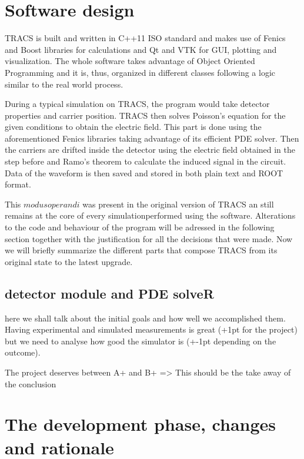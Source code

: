 \section{Software design} %
\label{sec:results_and_achievements}

TRACS is built and written in C++11 ISO standard and makes use of Fenics and Boost libraries for calculations and Qt and VTK for GUI, plotting and visualization. The whole software takes advantage of Object Oriented Programming and it is, thus, organized in different classes following a logic similar to the real world process.

During a typical simulation on TRACS, the program would take detector properties and carrier position. TRACS then solves Poisson's equation for the given conditions to obtain the electric field. This part is done using the aforementioned Fenics libraries taking advantage of its efficient PDE solver. Then the carriers are drifted inside the detector using the electric field obtained in the step before and Ramo's theorem to calculate the induced signal in the circuit. Data of the waveform is then saved and stored in both plain text and ROOT format.

This $modus operandi$ was present in the original version of TRACS an still remains at the core of every simulationperformed using the software. Alterations to the code and behaviour of the program will be adressed in the following section together with the justification for all the decisions that were made. Now we will briefly summarize the different parts that compose TRACS from its original state to the latest upgrade.

\subsection{detector module and PDE solveR}


here we shall talk about the initial goals and how well we accomplished them. Having experimental and simulated measurements is great (+1pt for the project) but we need to analyse how good the simulator is (+-1pt depending on the outcome).

The project deserves between A+ and B+ => This should be the take away of the conclusion


\section{The development phase, changes and rationale} %
\label{sec:let_s_put_the_project_in_perspective}

